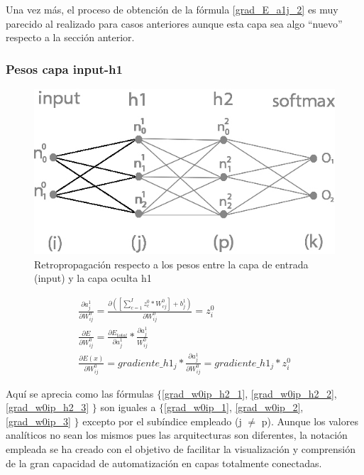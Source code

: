 Una vez más, el proceso de obtención de la fórmula \ref{grad_E_a1j_2} es muy parecido al realizado para casos anteriores aunque esta capa sea algo ``nuevo'' respecto a la sección anterior. \\


\subsubsection{Pesos capa input-h1}

\begin{figure}[H]
	\centering
	\includegraphics[scale=0.35]{imagenes/nn_2_capa_pesos_input_h1.jpg}  
	\caption{Retropropagación respecto a los pesos entre la capa de entrada (input) y la capa oculta h1}
	\label{fig:nn_2_pesos_input_h1}
\end{figure}


\begin{gather}
	\frac{\partial a^1_j }{\partial W^0_{ij} } = \frac{\partial ([\sum_{c=1}^{I} z^0_c * W^0_{cj}] + b^1_j)}{\partial W^0_{ij} } = z^0_i \label{grad_w0ip_h2_1} \\
	\frac{\partial E}{\partial W^0_{ij}} = \frac{\partial E_{total} }{\partial a^1_j } * \frac{\partial a^1_j}{W^0_{ij}} \label{grad_w0ip_h2_2} \\
	\frac{\partial E(x) }{\partial W^0_{ij} } = gradiente\_h1_j * \frac{\partial a^1_j }{\partial W^0_{ij} } = gradiente\_h1_j * z^0_i \label{grad_w0ip_h2_3}
\end{gather}

Aquí se aprecia como las fórmulas $\{$\ref{grad_w0ip_h2_1}, \ref{grad_w0ip_h2_2}, \ref{grad_w0ip_h2_3} $\}$ son iguales a $\{$\ref{grad_w0ip_1}, \ref{grad_w0ip_2}, \ref{grad_w0ip_3} $\}$ excepto por el subíndice empleado (j $\neq$ p). Aunque los valores analíticos no sean los mismos pues las arquitecturas son diferentes, la notación empleada se ha creado con el objetivo de facilitar la visualización y comprensión de la gran capacidad de automatización en capas totalmente conectadas.

